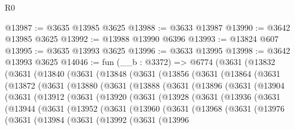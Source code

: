 \begin{lexlean}{R0}
\begin{coremodule}
@13987 := @3635 @13985 @3625
@13988 := @3633 @13987
@13990 := @3642 @13985 @3625
@13992 := @13988 @13990 @6396
@13993 := @13824 @607
@13995 := @3635 @13993 @3625
@13996 := @3633 @13995
@13998 := @3642 @13993 @3625
@14046 := fun (__b : @3372) =>
  @6774
    (@3631
      (@13832
        (@3631
          (@13840
            (@3631
              (@13848
                (@3631
                  (@13856
                    (@3631
                      (@13864
                        (@3631
                          (@13872
                            (@3631
                              (@13880
                                (@3631
                                  (@13888
                                    (@3631
                                      (@13896
                                        (@3631
                                          (@13904
                                            (@3631
                                              (@13912
                                                (@3631
                                                  (@13920
                                                    (@3631
                                                      (@13928
                                                        (@3631
                                                          (@13936
                                                            (@3631
                                                              (@13944
                                                                (@3631
                                                                  (@13952
                                                                    (@3631
                                                                      (@13960
                                                                        (@3631
                                                                          (@13968
                                                                            (@3631
                                                                              (@13976
                                                                                (@3631
                                                                                  (@13984
                                                                                    (@3631
                                                                                      (@13992
                                                                                        (@3631
                                                                                          (@13996

\end{coremodule}
\end{lexlean}
